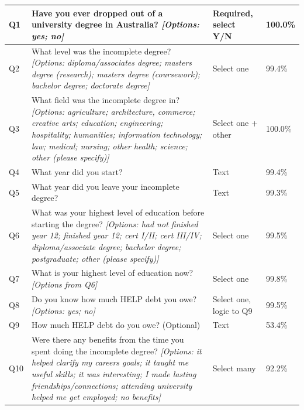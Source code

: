 \begin{longtable}{p{.7cm}p{18.6cm}p{2cm}p{2cm}}
        Q1    & Have you ever dropped out of a university degree in Australia? \newline \textit{[Options: yes; no]}      & Required, select Y/N          & 100.0\% \\
        \midrule
        Q2    & What level was the incomplete degree? \newline \textit{[Options: diploma/associates degree; masters degree (research); masters degree (coursework); bachelor degree; doctorate degree]} & Select one & 99.4\% \\
        \midrule
        Q3    & What field was the incomplete degree in? \newline \textit{[Options: agriculture; architecture, commerce; creative arts; education; engineering; hospitality; humanities; information technology; law; medical; nursing; other health; science; other (please specify)]} & Select one + other & 100.0\% \\
        \midrule
        Q4    & What year did you start? & Text  & 99.4\% \\
        \midrule
        Q5    & What year did you leave your incomplete degree? & Text  & 99.3\% \\
        \midrule
        Q6    & What was your highest level of education before starting the degree? \newline \textit{[Options: had not finished year 12; finished year 12; cert I/II; cert III/IV; diploma/associate degree; bachelor degree; postgraduate; other (please specify)]} & Select one & 99.5\% \\
        \midrule
        Q7    & What is your highest level of education now? \newline \textit{[Options from Q6]} & Select one & 99.8\% \\
        \midrule
        Q8    & Do you know how much HELP debt you owe? \newline \textit{[Options: yes; no]} & Select one, logic to Q9 & 99.5\% \\
        \midrule
        Q9    & How much HELP debt do you owe? (Optional) & Text  & 53.4\% \\
        \midrule
        Q10   & Were there any benefits from the time you spent doing the incomplete degree? \newline \textit{[Options: it helped clarify my careers goals; it taught me useful skills; it was interesting; I made lasting friendships/connections; attending university helped me get employed; no benefits]} & Select many & 92.2\% \\

\end{longtable}
